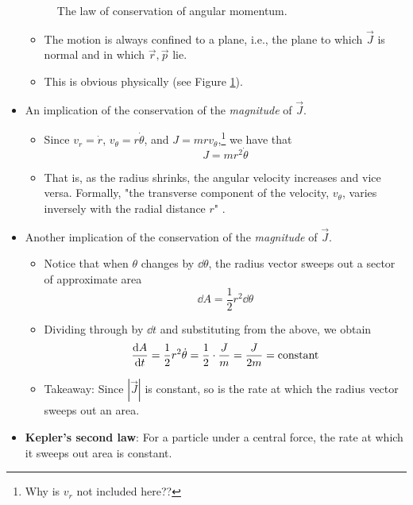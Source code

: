 \documentclass[../notes.tex]{subfiles}
\begin{document}
\begin{itemize}
\begin{figure}[h!]
        \caption{The law of conservation of angular momentum.}
        \label{fig:conservAngMtum}
    \end{figure}
    \begin{itemize}
        \item The motion is always confined to a plane, i.e., the plane to which $\vec{J}$ is normal and in which $\vec{r},\vec{p}$ lie.
        \item This is obvious physically (see Figure \ref{fig:conservAngMtum}).
    \end{itemize}
    \item An implication of the conservation of the \emph{magnitude} of $\vec{J}$.
    \begin{itemize}
        \item Since $v_r=\dot{r}$, $v_\theta=r\dot{\theta}$, and $J=mrv_\theta$,\footnote{Why is $v_r$ not included here??} we have that
        \begin{equation*}
            J = mr^2\dot{\theta}
        \end{equation*}
        \item That is, as the radius shrinks, the angular velocity increases and vice versa. Formally, "the transverse component of the velocity, $v_\theta$, varies inversely with the radial distance $r$" \parencite[57]{bib:KibbleBerkshire}.
    \end{itemize}
    \item Another implication of the conservation of the \emph{magnitude} of $\vec{J}$.
    \begin{itemize}
        \item Notice that when $\theta$ changes by $\dd\theta$, the radius vector sweeps out a sector of approximate area
        \begin{equation*}
            \dd{A} = \frac{1}{2}r^2\dd\theta
        \end{equation*}
        \item Dividing through by $\dd{t}$ and substituting from the above, we obtain
        \begin{equation*}
            \dv{A}{t} = \frac{1}{2}r^2\dot{\theta}
            = \frac{1}{2}\cdot\frac{J}{m}
            = \frac{J}{2m}
            = \text{constant}
        \end{equation*}
        \item Takeaway: Since $|\vec{J}|$ is constant, so is the rate at which the radius vector sweeps out an area.
    \end{itemize}
    \item \textbf{Kepler's second law}: For a particle under a central force, the rate at which it sweeps out area is constant.
\end{itemize}
\end{document}
